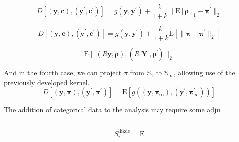   \[
    D\left[(\bm{y},\bm{c}), (\bm{y}^{\prime}, \bm{c}^{\prime})\right] = 
      g(\bm{y},\bm{y}^{\prime}) + 
          \frac{k}{1 + k}\lVert \text{E}[\bm{\rho}]_1 - \bm{\pi}^{\prime}\rVert_2
  \]
  
  \begin{equation*}
    D\left[(\bm{y},\bm{c}), (\bm{y}^{\prime}, \bm{c}^{\prime})\right] = 
      g(\bm{y},\bm{y}^{\prime}) + 
        \frac{k}{1 + k}\text{E}\left[\lVert \bm{\pi} - \bm{\pi}^{\prime}\rVert_2\right]
  \end{equation*}

  \[
    \text{E}\lVert (R\bm{y},\bm{\rho}), (R^\prime\bm{Y}^\prime,\bm{\rho}^\prime)\rVert_2
  \]


And in the fourth case, we can project $\pi$ from $\mathbb{S}_1$ to 
  $\mathbb{S}_{\infty}$, allowing use of the previously developed kernel.
  \begin{equation*}
    D\left[(\bm{y},\bm{\pi}), (\bm{y}^{\prime}, \bm{\pi}^{\prime})\right] = 
      \text{E}\left[ g\left((\bm{y},\bm{\pi}_{\infty}), 
            (\bm{y}^{\prime},\bm{\pi}_{\infty}^{\prime})\right)\right]
  \end{equation*}

The addition of categorical data to the analysis may require some adju

\subsection{}

\begin{equation*}
  S_i^{\text{lhkde}} = \text{E}
\end{equation*}



